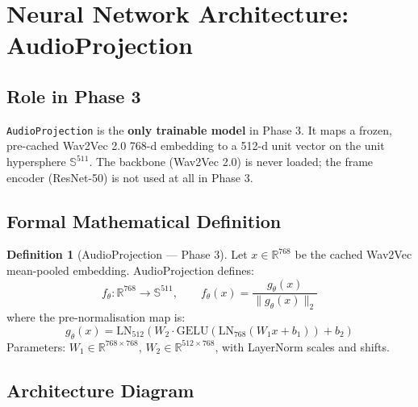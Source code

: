 \documentclass[12pt,a4paper]{article}
\theoremstyle{definition}
\newtheorem{definition}[theorem]{Definition}
\theoremstyle{remark}
\begin{document}
\section{Neural Network Architecture: AudioProjection}

\subsection{Role in Phase 3}

\texttt{AudioProjection} is the \textbf{only trainable model} in Phase 3.
It maps a frozen, pre-cached Wav2Vec 2.0 768-d embedding to a 512-d unit
vector on the unit hypersphere $\mathbb{S}^{511}$.
The backbone (Wav2Vec 2.0) is never loaded; the frame encoder (ResNet-50)
is not used at all in Phase 3.

\subsection{Formal Mathematical Definition}

\begin{definition}[AudioProjection — Phase 3]
Let $x \in \mathbb{R}^{768}$ be the cached Wav2Vec mean-pooled embedding.
AudioProjection defines:
\[
  f_\theta : \mathbb{R}^{768} \longrightarrow \mathbb{S}^{511}, \qquad
  f_\theta(x) = \frac{g_\theta(x)}{\|g_\theta(x)\|_2}
\]
where the pre-normalisation map is:
\[
  g_\theta(x) = \text{LN}_{512}\!\left(
    W_2 \cdot \text{GELU}\!\left(\text{LN}_{768}(W_1 x + b_1)\right) + b_2
  \right)
\]
Parameters: $W_1 \in \mathbb{R}^{768 \times 768}$,
$W_2 \in \mathbb{R}^{512 \times 768}$, with LayerNorm scales and shifts.
\end{definition}

\subsection{Architecture Diagram}
\end{document}
